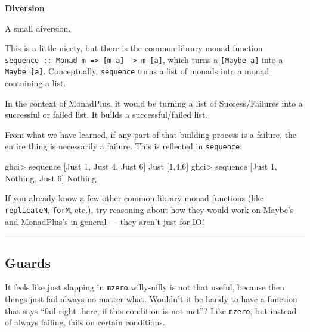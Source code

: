 \documentclass[]{article}
\newenvironment{Shaded}{}{}
\newcommand{\DataTypeTok}[1]{\textcolor[rgb]{0.56,0.13,0.00}{#1}}
\newcommand{\DecValTok}[1]{\textcolor[rgb]{0.25,0.63,0.44}{#1}}
\newcommand{\FunctionTok}[1]{\textcolor[rgb]{0.02,0.16,0.49}{#1}}
\newcommand{\NormalTok}[1]{#1}
\newcommand{\OperatorTok}[1]{\textcolor[rgb]{0.40,0.40,0.40}{#1}}
\begin{document}
\textbf{Diversion}

A small diversion.

This is a little nicety, but there is the common library monad function
\texttt{sequence\ ::\ Monad\ m\ =\textgreater{}\ {[}m\ a{]}\ -\textgreater{}\ m\ {[}a{]}},
which turns a \texttt{{[}Maybe\ a{]}} into a \texttt{Maybe\ {[}a{]}}.
Conceptually, \texttt{sequence} turns a list of monads into a monad containing a
list.

In the context of MonadPlus, it would be turning a list of Success/Failures into
a successful or failed list. It builds a successful/failed list.

From what we have learned, if any part of that building process is a failure,
the entire thing is necessarily a failure. This is reflected in
\texttt{sequence}:

\begin{Shaded}
\begin{Highlighting}[]
\NormalTok{ghci}\OperatorTok{\textgreater{}} \FunctionTok{sequence}\NormalTok{ [}\DataTypeTok{Just} \DecValTok{1}\NormalTok{, }\DataTypeTok{Just} \DecValTok{4}\NormalTok{, }\DataTypeTok{Just} \DecValTok{6}\NormalTok{]}
\DataTypeTok{Just}\NormalTok{ [}\DecValTok{1}\NormalTok{,}\DecValTok{4}\NormalTok{,}\DecValTok{6}\NormalTok{]}
\NormalTok{ghci}\OperatorTok{\textgreater{}} \FunctionTok{sequence}\NormalTok{ [}\DataTypeTok{Just} \DecValTok{1}\NormalTok{, }\DataTypeTok{Nothing}\NormalTok{, }\DataTypeTok{Just} \DecValTok{6}\NormalTok{]}
\DataTypeTok{Nothing}
\end{Highlighting}
\end{Shaded}

If you already know a few other common library monad functions (like
\texttt{replicateM}, \texttt{forM}, etc.), try reasoning about how they would
work on Maybe's and MonadPlus's in general --- they aren't just for IO!

\begin{center}\rule{0.5\linewidth}{0.5pt}\end{center}

\subsection{Guards}\label{guards}

It feels like just slapping in \texttt{mzero} willy-nilly is not that useful,
because then things just fail always no matter what. Wouldn't it be handy to
have a function that says ``fail right\ldots here, if this condition is not
met''? Like \texttt{mzero}, but instead of always failing, fails on certain
conditions.
\end{document}
